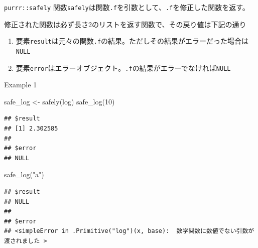 \documentclass[
  ignorenonframetext,
  aspectratio=169]{beamer}
\newenvironment{Shaded}{\begin{snugshade}}{\end{snugshade}}
\newcommand{\DecValTok}[1]{\textcolor[rgb]{0.00,0.00,0.81}{#1}}
\newcommand{\FunctionTok}[1]{\textcolor[rgb]{0.00,0.00,0.00}{#1}}
\newcommand{\NormalTok}[1]{#1}
\newcommand{\OtherTok}[1]{\textcolor[rgb]{0.56,0.35,0.01}{#1}}
\newcommand{\StringTok}[1]{\textcolor[rgb]{0.31,0.60,0.02}{#1}}
\providecommand{\tightlist}{%
  \setlength{\itemsep}{0pt}\setlength{\parskip}{0pt}}
\begin{document}
\begin{frame}[fragile]{\texttt{purrr::safely}}
\protect\hypertarget{purrrsafely}{}
関数\texttt{safely}は関数\texttt{.f}を引数として、\texttt{.f}を修正した関数を返す。

修正された関数は必ず長さ2のリストを返す関数で、その戻り値は下記の通り

\begin{enumerate}
\tightlist
\item
  要素\texttt{result}は元々の関数\texttt{.f}の結果。ただしその結果がエラーだった場合は\texttt{NULL}
\item
  要素\texttt{error}はエラーオブジェクト。\texttt{.f}の結果がエラーでなければ\texttt{NULL}
\end{enumerate}
\end{frame}

\begin{frame}[fragile]{Example 1}
\protect\hypertarget{example-1-1}{}
\begin{Shaded}
\begin{Highlighting}[]
\NormalTok{safe\_log }\OtherTok{\textless{}{-}} \FunctionTok{safely}\NormalTok{(log)}
\FunctionTok{safe\_log}\NormalTok{(}\DecValTok{10}\NormalTok{)}
\end{Highlighting}
\end{Shaded}

\begin{verbatim}
## $result
## [1] 2.302585
## 
## $error
## NULL
\end{verbatim}

\begin{Shaded}
\begin{Highlighting}[]
\FunctionTok{safe\_log}\NormalTok{(}\StringTok{"a"}\NormalTok{)}
\end{Highlighting}
\end{Shaded}

\begin{verbatim}
## $result
## NULL
## 
## $error
## <simpleError in .Primitive("log")(x, base):  数学関数に数値でない引数が渡されました >
\end{verbatim}
\end{frame}
\end{document}
